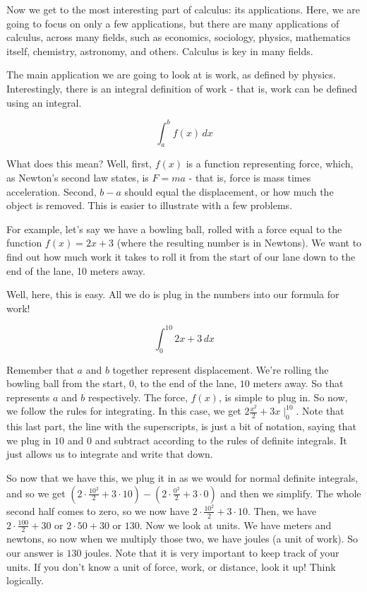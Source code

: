 Now we get to the most interesting part of calculus: its applications. 
Here, we are going to focus on only a few applications, but there are many applications of calculus, across many fields, such as economics, sociology, physics, mathematics itself, chemistry, astronomy, and others. 
Calculus is key in many fields.

The main application we are going to look at is work, as defined by physics. 
Interestingly, there is an integral definition of work - that is, work can be defined using an integral.

\begin{equation*}
    \int^b_a f(x) \, dx
\end{equation*}

What does this mean? 
Well, first, $f(x)$ is a function representing force, which, as Newton's second law states, is $F = ma$ - that is, force is mass times acceleration. 
Second, $b - a$ should equal the displacement, or how much the object is removed. 
This is easier to illustrate with a few problems.

For example, let's say we have a bowling ball, rolled with a force equal to the function $f(x) = 2x+3$ (where the resulting number is in Newtons). 
We want to find out how much work it takes to roll it from the start of our lane down to the end of the lane, 10 meters away.

Well, here, this is easy. All we do is plug in the numbers into our formula for work! 

\begin{equation*}
    \int^{10}_0 2x+3 \, dx
\end{equation*}

Remember that $a$ and $b$ together represent displacement. 
We're rolling the bowling ball from the start, $0$, to the end of the lane, $10$ meters away. 
So that represents $a$ and $b$ respectively. 
The force, $f(x)$, is simple to plug in. 
So now, we follow the rules for integrating. 
In this case, we get $2\frac{x^2}{2}+3x\mid^{10}_0$. 
Note that this last part, the line with the superscripts, is just a bit of notation, saying that we plug in $10$ and $0$ and subtract according to the rules of definite integrals. 
It just allows us to integrate and write that down. 

So now that we have this, we plug it in as we would for normal definite integrals, and so we get $(2\cdot\frac{10^2}{2}+3\cdot 10) - (2\cdot\frac{0^2}{2}+3\cdot 0)$ and then we simplify. 
The whole second half comes to zero, so we now have $2\cdot\frac{10^2}{2}+3\cdot 10$. 
Then, we have $2\cdot \frac{100}{2}+ 30$ or $2\cdot 50 + 30$ or $130$. 
Now we look at units. 
We have meters and newtons, so now when we multiply those two, we have joules (a unit of work). 
So our answer is $130$ joules. 
Note that it is very important to keep track of your units. If you don't know a unit of force, work, or distance, look it up! Think logically.

